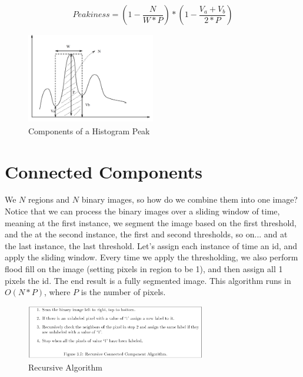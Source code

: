 \documentclass{article}
\begin{document}
$$ Peakiness = (1-\frac{N}{W * P}) * (1-\frac{V_a+V_b}{2*P})$$

\begin{figure}[!htb]
    \begin{center}
        \includegraphics[height=4cm,width=0.5\textwidth]{L5F4.png}
        \vspace{-20pt}
    \end{center}
    \caption{Components of a Histogram Peak}
\end{figure}

\noindent
\section{Connected Components}
We $N$ regions and $N$ binary images, so how do we combine them into one image? Notice that we can process the binary images over a sliding window of time, meaning at the first instance, we segment the image based on the first threshold, and the at the second instance, the first and second thresholds, so on... and at the last instance, the last threshold. Let's assign each instance of time an id, and apply the sliding window. Every time we apply the thresholding, we also perform flood fill on the image (setting pixels in region to be 1), and then assign all 1 pixels the id. The end result is a fully segmented image. This algorithm runs in $O(N*P)$, where $P$ is the number of pixels.

\begin{figure}[!htb]
    \begin{center}
        \includegraphics[width=0.7\textwidth]{L5F5.png}
        \vspace{-20pt}
    \end{center}
    \caption{Recursive Algorithm}
\end{figure}
\end{document}
